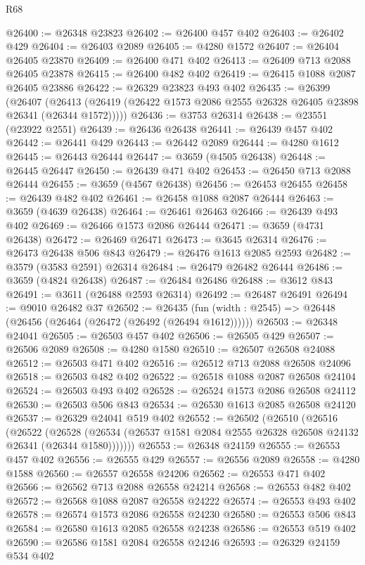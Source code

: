 \begin{lexlean}{R68}
\begin{coremodule}
@26400 := @26348 @23823
@26402 := @26400 @457 @402
@26403 := @26402 @429
@26404 := @26403 @2089
@26405 := @4280 @1572
@26407 := @26404 @26405 @23870
@26409 := @26400 @471 @402
@26413 := @26409 @713 @2088 @26405 @23878
@26415 := @26400 @482 @402
@26419 := @26415 @1088 @2087 @26405 @23886
@26422 := @26329 @23823 @493 @402
@26435 := @26399
    (@26407 (@26413 (@26419 (@26422 @1573 @2086 @2555 @26328 @26405 @23898 @26341 (@26344 @1572)))))
@26436 := @3753 @26314
@26438 := @23551 (@23922 @2551)
@26439 := @26436 @26438
@26441 := @26439 @457 @402
@26442 := @26441 @429
@26443 := @26442 @2089
@26444 := @4280 @1612
@26445 := @26443 @26444
@26447 := @3659 (@4505 @26438)
@26448 := @26445 @26447
@26450 := @26439 @471 @402
@26453 := @26450 @713 @2088 @26444
@26455 := @3659 (@4567 @26438)
@26456 := @26453 @26455
@26458 := @26439 @482 @402
@26461 := @26458 @1088 @2087 @26444
@26463 := @3659 (@4639 @26438)
@26464 := @26461 @26463
@26466 := @26439 @493 @402
@26469 := @26466 @1573 @2086 @26444
@26471 := @3659 (@4731 @26438)
@26472 := @26469 @26471
@26473 := @3645 @26314
@26476 := @26473 @26438 @506 @843
@26479 := @26476 @1613 @2085 @2593
@26482 := @3579 (@3583 @2591) @26314
@26484 := @26479 @26482 @26444
@26486 := @3659 (@4824 @26438)
@26487 := @26484 @26486
@26488 := @3612 @843
@26491 := @3611 (@26488 @2593 @26314)
@26492 := @26487 @26491
@26494 := @9010 @26482 @37
@26502 := @26435 (fun (width : @2545) => @26448 (@26456 (@26464 (@26472 (@26492 (@26494 @1612))))))
@26503 := @26348 @24041
@26505 := @26503 @457 @402
@26506 := @26505 @429
@26507 := @26506 @2089
@26508 := @4280 @1580
@26510 := @26507 @26508 @24088
@26512 := @26503 @471 @402
@26516 := @26512 @713 @2088 @26508 @24096
@26518 := @26503 @482 @402
@26522 := @26518 @1088 @2087 @26508 @24104
@26524 := @26503 @493 @402
@26528 := @26524 @1573 @2086 @26508 @24112
@26530 := @26503 @506 @843
@26534 := @26530 @1613 @2085 @26508 @24120
@26537 := @26329 @24041 @519 @402
@26552 := @26502
    (@26510
      (@26516
        (@26522
          (@26528 (@26534 (@26537 @1581 @2084 @2555 @26328 @26508 @24132 @26341 (@26344 @1580)))))))
@26553 := @26348 @24159
@26555 := @26553 @457 @402
@26556 := @26555 @429
@26557 := @26556 @2089
@26558 := @4280 @1588
@26560 := @26557 @26558 @24206
@26562 := @26553 @471 @402
@26566 := @26562 @713 @2088 @26558 @24214
@26568 := @26553 @482 @402
@26572 := @26568 @1088 @2087 @26558 @24222
@26574 := @26553 @493 @402
@26578 := @26574 @1573 @2086 @26558 @24230
@26580 := @26553 @506 @843
@26584 := @26580 @1613 @2085 @26558 @24238
@26586 := @26553 @519 @402
@26590 := @26586 @1581 @2084 @26558 @24246
@26593 := @26329 @24159 @534 @402

\end{coremodule}
\end{lexlean}
